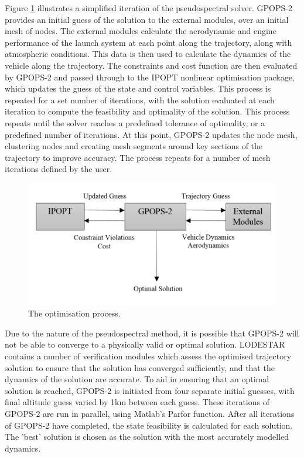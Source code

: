  


Figure \ref{fig:FlowChartSmall} illustrates a simplified iteration of the pseudospectral solver. GPOPS-2 provides an initial guess of the solution to the external modules, over an initial mesh of nodes.
The external modules calculate the aerodynamic and engine performance of the launch system at each point along the trajectory, along with atmospheric conditions. This data is then used to calculate the dynamics of the vehicle along the trajectory. The constraints and cost function are then evaluated by GPOPS-2 and passed through to the IPOPT nonlinear optimisation package\cite{Wachter2006}, which updates the guess of the state and control variables. This process is repeated for a set number of iterations, with the solution evaluated at each iteration to compute the feasibility and optimality of the solution. This process repeats until the solver reaches a predefined tolerance of optimality, or a predefined number of iterations. At this point, GPOPS-2 updates the node mesh, clustering nodes and creating mesh segments around key sections of the trajectory to improve accuracy. The process repeats for a number of mesh iterations defined by the user. 
\begin{figure}[ht]
	\centering
	\includegraphics[width=0.75\linewidth]{figures/4_LODESTAR/FlowChartSmall}
	\caption{The optimisation process.}
	\label{fig:FlowChartSmall}
\end{figure}

Due to the nature of the pseudospectral method, it is possible that GPOPS-2 will not be able to converge to a physically valid or optimal solution. 
LODESTAR contains a number of verification modules which assess the optimised trajectory solution to ensure that the solution has converged sufficiently, and that the dynamics of the solution are accurate. 
To aid in ensuring that an optimal solution is reached, GPOPS-2 is initiated from four separate initial guesses, with final altitude guess varied by 1km between each guess. These iterations of GPOPS-2 are run in parallel, using Matlab's Parfor function. After all iterations of GPOPS-2 have completed, the state feasibility is calculated for each solution. The 'best' solution is chosen as the solution with the most accurately modelled dynamics. 



